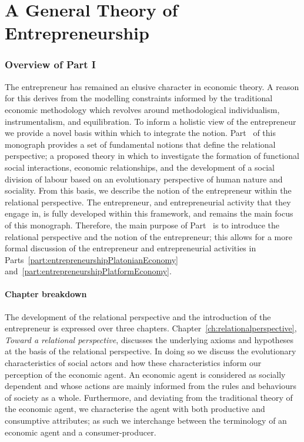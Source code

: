\part{A General Theory of Entrepreneurship} 
\label{part:generalTheoryEntrepreneurship}

\section*{Overview of Part I}

The entrepreneur has remained an elusive character in economic theory. A reason for this derives from the modelling constraints informed by the traditional economic methodology which revolves around methodological individualism, instrumentalism, and equilibration. To inform a holistic view of the entrepreneur we provide a novel basis within which to integrate the notion. Part~\ref{part:generalTheoryEntrepreneurship} of this monograph provides a set of fundamental notions that define the relational perspective; a proposed theory in which to investigate the formation of functional social interactions, economic relationships, and the development of a social division of labour based on an evolutionary perspective of human nature and sociality. From this basis, we describe the notion of the entrepreneur within the relational perspective. The entrepreneur, and entrepreneurial activity that they engage in, is fully developed within this framework, and remains the main focus of this monograph. Therefore, the main purpose of Part~\ref{part:generalTheoryEntrepreneurship} is to introduce the relational perspective and the notion of the entrepreneur; this allows for a more formal discussion of the entrepreneur and entrepreneurial activities in Parts~\ref{part:entrepreneurshipPlatonianEconomy} and~\ref{part:entrepreneurshipPlatformEconomy}.

\subsection*{Chapter breakdown}

The development of the relational perspective and the introduction of the entrepreneur is expressed over three chapters. Chapter~\ref{ch:relationalperspective}, \emph{Toward a relational perspective}, discusses the underlying axioms and hypotheses at the basis of the relational perspective. In doing so we discuss the evolutionary characteristics of social actors and how these characteristics inform our perception of the economic agent. An economic agent is considered as socially dependent and whose actions are mainly informed from the rules and behaviours of society as a whole. Furthermore, and deviating from the traditional theory of the economic agent, we characterise the agent with both productive and consumptive attributes; as such we interchange between the terminology of an economic agent and a consumer-producer.

